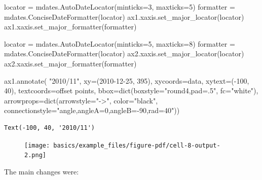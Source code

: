 \documentclass[
  letterpaper,
  DIV=11,
  numbers=noendperiod,
  oneside]{scrreprt}
\newenvironment{Shaded}{\begin{snugshade}}{\end{snugshade}}
\newcommand{\BuiltInTok}[1]{\textcolor[rgb]{0.00,0.23,0.31}{#1}}
\newcommand{\DecValTok}[1]{\textcolor[rgb]{0.68,0.00,0.00}{#1}}
\newcommand{\NormalTok}[1]{\textcolor[rgb]{0.00,0.23,0.31}{#1}}
\newcommand{\OperatorTok}[1]{\textcolor[rgb]{0.37,0.37,0.37}{#1}}
\newcommand{\StringTok}[1]{\textcolor[rgb]{0.13,0.47,0.30}{#1}}
\begin{document}
\begin{Shaded}
\begin{Highlighting}[]
\NormalTok{locator }\OperatorTok{=}\NormalTok{ mdates.AutoDateLocator(minticks}\OperatorTok{=}\DecValTok{3}\NormalTok{, maxticks}\OperatorTok{=}\DecValTok{5}\NormalTok{)}
\NormalTok{formatter }\OperatorTok{=}\NormalTok{ mdates.ConciseDateFormatter(locator)}
\NormalTok{ax1.xaxis.set\_major\_locator(locator)}
\NormalTok{ax1.xaxis.set\_major\_formatter(formatter)}

\NormalTok{locator }\OperatorTok{=}\NormalTok{ mdates.AutoDateLocator(minticks}\OperatorTok{=}\DecValTok{5}\NormalTok{, maxticks}\OperatorTok{=}\DecValTok{8}\NormalTok{)}
\NormalTok{formatter }\OperatorTok{=}\NormalTok{ mdates.ConciseDateFormatter(locator)}
\NormalTok{ax2.xaxis.set\_major\_locator(locator)}
\NormalTok{ax2.xaxis.set\_major\_formatter(formatter)}

\NormalTok{ax1.annotate(}
    \StringTok{"2010/11"}\NormalTok{,}
\NormalTok{    xy}\OperatorTok{=}\NormalTok{(}\StringTok{\textquotesingle{}2010{-}12{-}25\textquotesingle{}}\NormalTok{, }\DecValTok{395}\NormalTok{),  xycoords}\OperatorTok{=}\StringTok{\textquotesingle{}data\textquotesingle{}}\NormalTok{,}
\NormalTok{    xytext}\OperatorTok{=}\NormalTok{(}\OperatorTok{{-}}\DecValTok{100}\NormalTok{, }\DecValTok{40}\NormalTok{), textcoords}\OperatorTok{=}\StringTok{\textquotesingle{}offset points\textquotesingle{}}\NormalTok{,}
\NormalTok{    bbox}\OperatorTok{=}\BuiltInTok{dict}\NormalTok{(boxstyle}\OperatorTok{=}\StringTok{"round4,pad=.5"}\NormalTok{, fc}\OperatorTok{=}\StringTok{"white"}\NormalTok{),}
\NormalTok{    arrowprops}\OperatorTok{=}\BuiltInTok{dict}\NormalTok{(arrowstyle}\OperatorTok{=}\StringTok{"{-}\textgreater{}"}\NormalTok{,}
\NormalTok{                    color}\OperatorTok{=}\StringTok{"black"}\NormalTok{,}
\NormalTok{                    connectionstyle}\OperatorTok{=}\StringTok{"angle,angleA=0,angleB={-}90,rad=40"}\NormalTok{))}
\end{Highlighting}
\end{Shaded}

\begin{verbatim}
Text(-100, 40, '2010/11')
\end{verbatim}

\begin{figure}[H]

{\centering \texttt{[image: basics/example\_files/figure-pdf/cell-8-output-2.png]}

}

\end{figure}

The main changes were:
\end{document}
